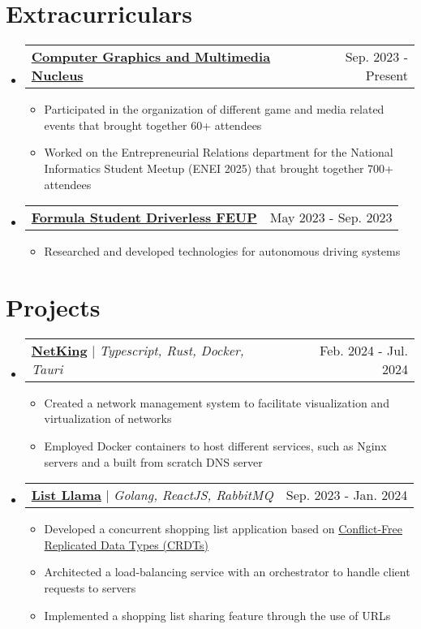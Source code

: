 \documentclass[a4paper,11pt]{article}
\makeatletter
\newcommand{\resumeItem}[1]{
  \item\small{
    {#1 \vspace{-2pt}}
  }
}
\newcommand{\resumeProjectHeading}[2]{
    \item
    \begin{tabular*}{0.97\textwidth}{l@{\extracolsep{\fill}}r}
      \small#1 & #2 \\
    \end{tabular*}\vspace{-7pt}
}
\newcommand{\resumeSubHeadingListStart}{\begin{itemize}[leftmargin=0.15in, label={}]}
\newcommand{\resumeSubHeadingListEnd}{\end{itemize}}
\newcommand{\resumeItemListStart}{\begin{itemize}}
\newcommand{\resumeItemListEnd}{\end{itemize}\vspace{-5pt}}
\makeatother
\begin{document}
\section{Extracurriculars}
    \resumeSubHeadingListStart
      \resumeProjectHeading
                {\textbf{\href{https://ncgm.fe.up.pt/}{Computer Graphics and Multimedia Nucleus}}}{Sep. 2023 - Present}
          \resumeItemListStart
            \resumeItem{Participated in the organization of different game and media related events that brought together 60+ attendees}
			\resumeItem{Worked on the Entrepreneurial Relations department for the National Informatics Student Meetup (ENEI 2025) that brought together 700+ attendees}
          \resumeItemListEnd
      \resumeProjectHeading
          {\textbf{\href{https://formulastudent.fe.up.pt/en/}{Formula Student Driverless FEUP}}}{May 2023 - Sep. 2023}
          \resumeItemListStart
            \resumeItem{Researched and developed technologies for autonomous driving systems}
          \resumeItemListEnd
    \resumeSubHeadingListEnd
\leavevmode



\section{Projects}
\resumeSubHeadingListStart
      \resumeProjectHeading
          {\textbf{\href{https://github.com/matilde-silva-21/grs_project}{NetKing}} $|$ \emph{Typescript, Rust, Docker, Tauri}}{Feb. 2024 - Jul. 2024}
          \resumeItemListStart
            \resumeItem{Created a network management system to facilitate visualization and virtualization of networks}
            \resumeItem{Employed Docker containers to host different services, such as Nginx servers and a built from scratch DNS server}
          \resumeItemListEnd
      \resumeProjectHeading
          {\textbf{\href{https://github.com/matilde-silva-21/SDLE_project}{List Llama}} $|$ \emph{Golang, ReactJS, RabbitMQ}}{Sep. 2023 - Jan. 2024}
          \resumeItemListStart
            \resumeItem{Developed a concurrent shopping list application based on \href{https://crdt.tech/}{Conflict-Free Replicated Data Types (CRDTs)}}
            \resumeItem{Architected a load-balancing service with an orchestrator to handle client requests to servers}
            \resumeItem{Implemented a shopping list sharing feature through the use of URLs}
          \resumeItemListEnd
    \resumeSubHeadingListEnd
\leavevmode 
\end{document}
